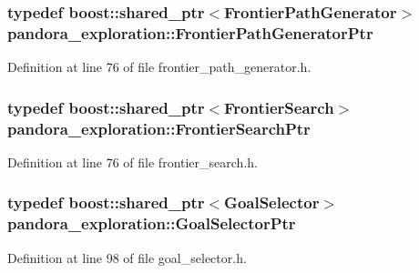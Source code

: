 \hypertarget{namespacepandora__exploration_abbf4ad7ffa7938b40818f00f8b3615ed}{
\subsubsection[{\-Frontier\-Path\-Generator\-Ptr}]{\setlength{\rightskip}{0pt plus 5cm}typedef boost\-::shared\-\_\-ptr$<${\bf \-Frontier\-Path\-Generator}$>$ {\bf pandora\-\_\-exploration\-::\-Frontier\-Path\-Generator\-Ptr}}}\label{namespacepandora__exploration_abbf4ad7ffa7938b40818f00f8b3615ed}


\-Definition at line 76 of file frontier\-\_\-path\-\_\-generator.\-h.

\hypertarget{namespacepandora__exploration_a64e0f8af651e5cb4686da16f76e6f34c}{
\subsubsection[{\-Frontier\-Search\-Ptr}]{\setlength{\rightskip}{0pt plus 5cm}typedef boost\-::shared\-\_\-ptr$<${\bf \-Frontier\-Search}$>$ {\bf pandora\-\_\-exploration\-::\-Frontier\-Search\-Ptr}}}\label{namespacepandora__exploration_a64e0f8af651e5cb4686da16f76e6f34c}


\-Definition at line 76 of file frontier\-\_\-search.\-h.

\hypertarget{namespacepandora__exploration_a5fbf474bbabd4fc908e71b1674797edd}{
\subsubsection[{\-Goal\-Selector\-Ptr}]{\setlength{\rightskip}{0pt plus 5cm}typedef boost\-::shared\-\_\-ptr$<${\bf \-Goal\-Selector}$>$ {\bf pandora\-\_\-exploration\-::\-Goal\-Selector\-Ptr}}}\label{namespacepandora__exploration_a5fbf474bbabd4fc908e71b1674797edd}


\-Definition at line 98 of file goal\-\_\-selector.\-h.


